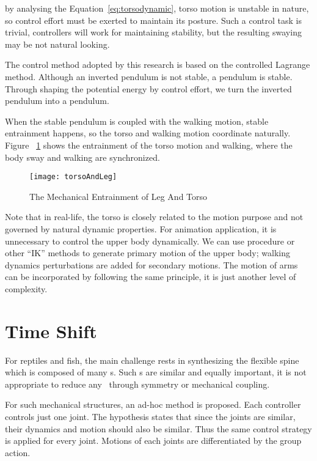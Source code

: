 by analysing the Equation~\ref{eq:torsodynamic},  torso motion is unstable in nature,  so control effort must be exerted to maintain its posture.
Such a control task is trivial,  \pd controllers will work for maintaining stability, but the resulting swaying may  be not natural looking.

The control method adopted by this research is based on the controlled Lagrange method.
Although an inverted pendulum is not stable, a pendulum is stable.
Through shaping the potential energy by control effort, we  turn the inverted pendulum into a pendulum.

When the stable pendulum is coupled with the walking motion, stable entrainment happens, so the torso and walking motion coordinate naturally. 
Figure ~\ref{fig:torsolegentrainment} shows the entrainment of the torso motion and walking, where the body sway and walking  are synchronized.
\begin{figure}[!htbp]
  \begin{center}
      \texttt{[image: torsoAndLeg]}
    \caption{The Mechanical Entrainment of Leg And Torso}
    \label{fig:torsolegentrainment}
\end{center}
\end{figure}




Note that in real-life, the torso is closely related to the motion purpose and not governed by natural dynamic properties.
For animation application,  it is unnecessary to control the upper body dynamically.
We can use procedure or other ``IK'' methods to generate primary  motion of the upper body;
walking dynamics perturbations are added for secondary motions.
The motion of arms can be incorporated by following the same principle, it is just another level of complexity.


\section{Time Shift}

For reptiles and fish, the main challenge rests in synthesizing the flexible spine which is composed of many {\dof}s.
Such {\dof}s are similar and equally important, it is not appropriate to reduce any \dof\  through symmetry or mechanical coupling.

For such mechanical structures, an ad-hoc method is proposed.
Each controller controls just one joint.
The hypothesis states that since the joints are similar, their dynamics and motion should also be similar.
Thus the same control strategy is applied for every joint.
Motions of each joints are differentiated by the group action.


